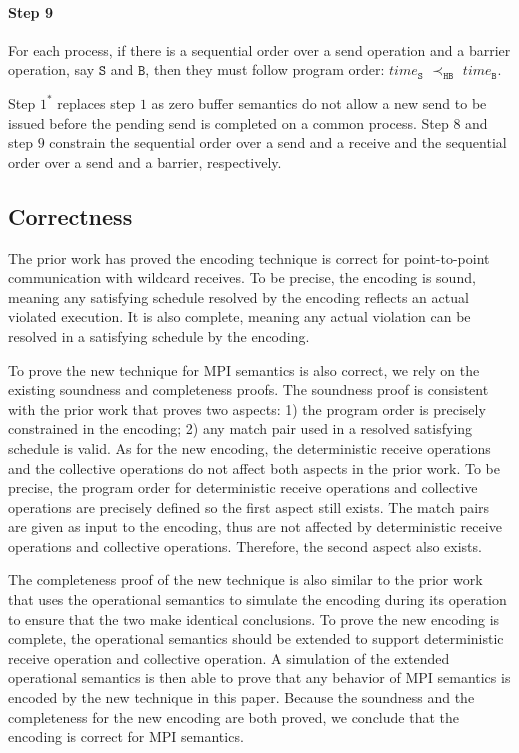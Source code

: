 \paragraph*{Step 9} For each process, if there is a sequential order over a send operation and a barrier operation, say $\mathtt{S}$ and $\mathtt{B}$, then they must follow program order: 
$\mathit{time}_\mathtt{S}$
$\prec_\mathtt{HB}$ $\mathit{time}_\mathtt{B}$.

Step $1^*$ replaces step $1$ as zero buffer semantics do not allow a new send to be issued before the pending send is completed on a common process. Step $8$ and step $9$ constrain the sequential order over a send and a receive and the sequential order over a send and a barrier, respectively.

\subsection{Correctness}

The prior work \cite{DBLP:conf/kbse/HuangMM13} has proved the encoding technique is correct for point-to-point communication with wildcard receives. To be precise, the encoding is sound, meaning any satisfying schedule resolved by the encoding reflects an actual violated execution. It is also complete, meaning any actual violation can be resolved in a satisfying schedule by the encoding. 

To prove the new technique for MPI semantics is also correct, we rely on the existing soundness and completeness proofs. The soundness proof is consistent with the prior work that proves two aspects: 1) the program order is precisely constrained in the encoding; 2) any match pair used in a resolved satisfying schedule is valid. As for the new encoding, the deterministic receive operations and the collective operations do not affect both aspects in the prior work. To be precise, the program order for deterministic receive operations and collective operations are precisely defined so the first aspect still exists. The match pairs are given as input to the encoding, thus are not affected by deterministic receive operations and collective operations. Therefore, the second aspect also exists. 

The completeness proof of the new technique is also similar to the prior work that uses the operational semantics to simulate the encoding during its operation to ensure that the two make identical conclusions. To prove the new encoding is complete, the operational semantics should be extended to support deterministic receive operation and collective operation. A simulation of the extended operational semantics is then able to prove that any behavior of MPI semantics is encoded by the new technique in this paper. Because the soundness and the completeness for the new encoding are both proved, we conclude that the encoding is correct for MPI semantics. 


